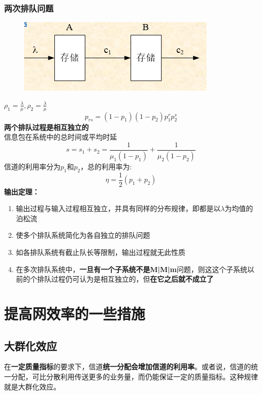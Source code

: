 \subsubsection{两次排队问题}
\begin{figure}[H]
	\centering
	\includegraphics[width=0.7\linewidth]{figures/screenshot033}
	\caption{}
	\label{fig:screenshot033}
\end{figure}
$ \rho_1 = \frac{\lambda}{\mu} ,\rho_2 = \frac{\lambda}{\mu}$
\begin{equation}\label{key}
p_{rs} = (1-p_1)(1-p_2)p_1^rp_2^s
\end{equation}
\textbf{两个排队过程是相互独立的}\\
信息包在系统中的总时间或平均时延
\begin{equation}\label{key}
s = s_1 + s_2 = \frac{1}{\mu_1(1-p_1)} +\frac{1}{\mu_2(1-p_2)}
\end{equation}
信道的利用率分为$ p_1 $和$ p_2 $，总的利用率为:
\begin{equation}\label{key}
\eta = \frac{1}{2}(p_1+p_2)
\end{equation}
\textbf{输出定理：}
\begin{enumerate}
	\item 输出过程与输入过程相互独立，并具有同样的分布规律，即都是以$ \lambda$为均值的泊松流
	\item 使多个排队系统简化为各自独立的排队问题
	\item 如各排队系统有截止队长等限制，输出过程就无此性质
	\item 在多次排队系统中，\textbf{一旦有一个子系统不是M|M|m}问题，则这这个子系统以前的个排队过程仍可认为是相互独立的，但\textbf{在它之后就不成立了}
\end{enumerate}
\section{提高网效率的一些措施}
\subsection{大群化效应}
在\textbf{一定质量指标}的要求下，信道\textbf{统一分配会增加信道的利用率}。或者说，信道的统一分配，可比分散利用传送更多的业务量，而仍能保证一定的质量指标。这种规律就是大群化效应。
